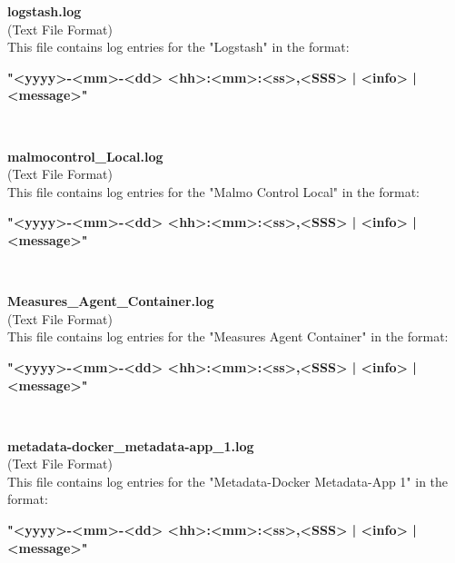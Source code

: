 \begin{description}
\begin{addmargin}[0em]{0em}
    \label{logstash.log}
    \begin{addmargin}[1em]{0em} %
        \textbf{logstash.log}\\
        (Text File Format)\\
        This file contains log entries for the "Logstash" in the format:
        \begin{addmargin}[1em]{0em}
            \textbf{"<yyyy>-<mm>-<dd> <hh>:<mm>:<ss>,<SSS> | <info> | <message>"}
        \end{addmargin}
    \end{addmargin} %
    \textbf{\\}

    \label{malmocontrol_Local.log}
    \begin{addmargin}[1em]{0em} %
        \textbf{malmocontrol\_Local.log}\\
        (Text File Format)\\
        This file contains log entries for the "Malmo Control Local" in the format:
        \begin{addmargin}[1em]{0em}
            \textbf{"<yyyy>-<mm>-<dd> <hh>:<mm>:<ss>,<SSS> | <info> | <message>"}
        \end{addmargin}
    \end{addmargin} %
    \textbf{\\}

    \label{Measures_Agent_Container.log}
    \begin{addmargin}[1em]{0em} %
        \textbf{Measures\_Agent\_Container.log}\\
        (Text File Format)\\
        This file contains log entries for the "Measures Agent Container" in the format:
        \begin{addmargin}[1em]{0em}
            \textbf{"<yyyy>-<mm>-<dd> <hh>:<mm>:<ss>,<SSS> | <info> | <message>"}
        \end{addmargin}
    \end{addmargin} %
    \textbf{\\}

    \label{metadata-docker_metadata-app_1.log}
    \begin{addmargin}[1em]{0em} %
        \textbf{metadata-docker\_metadata-app\_1.log}\\
        (Text File Format)\\
        This file contains log entries for the "Metadata-Docker Metadata-App 1" in the format:
        \begin{addmargin}[1em]{0em}
            \textbf{"<yyyy>-<mm>-<dd> <hh>:<mm>:<ss>,<SSS> | <info> | <message>"}
        \end{addmargin}
    \end{addmargin} %
    \textbf{\\}


\end{addmargin}
\end{description}
